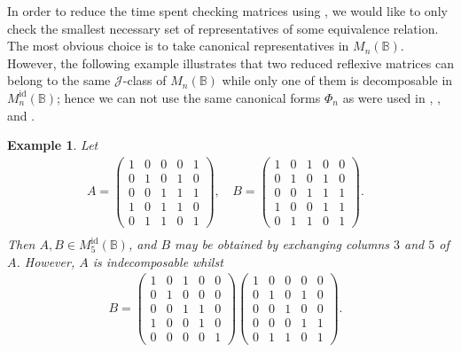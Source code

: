 \documentclass[11pt]{article}
\newtheorem{exa}[thm]{Example}
\newenvironment{ex}{\begin{exa}\rm}{\end{exa}}
\numberwithin{equation}{section}
\newcommand{\B}{\mathbb{B}}
\newcommand{\Bn}{M_n(\B)}
\newcommand{\Refn}{M_n^{\text{id}}(\B)}
\newcommand{\Ref}[1]{M_{#1}^{\text{id}}(\B)}
\newcommand{\J}{\mathscr{J}}
\begin{document}
In order to reduce the time spent checking matrices using
, we would like to only check the smallest
necessary set of representatives of some equivalence relation. The most obvious
choice is to take canonical representatives in $\Bn$. However, the following
example illustrates that two reduced reflexive matrices can belong to the same
$\J$-class of $\Bn$ while only one of them is decomposable in $\Refn$; hence we
can not use the same canonical forms $\Phi_n$ as were used in
, , and . 
\begin{ex}
  Let
\begin{align*}
  A = \begin{pmatrix}
    1 & 0 & 0 & 0 & 1 \\
    0 & 1 & 0 & 1 & 0 \\
    0 & 0 & 1 & 1 & 1 \\
    1 & 0 & 1 & 1 & 0 \\
    0 & 1 & 1 & 0 & 1 
  \end{pmatrix}\text{, }&
  B = \begin{pmatrix}
    1 & 0 & 1 & 0 & 0 \\
    0 & 1 & 0 & 1 & 0 \\
    0 & 0 & 1 & 1 & 1 \\
    1 & 0 & 0 & 1 & 1 \\
    0 & 1 & 1 & 0 & 1 
  \end{pmatrix}.&\\
\end{align*}
Then $A, B \in \Ref{5}$, and $B$ may be obtained by exchanging columns $3$ and
$5$ of $A$. However, $A$ is indecomposable whilst
\begin{align*}
  B = \begin{pmatrix}
    1 & 0 & 1 & 0 & 0 \\
    0 & 1 & 0 & 0 & 0 \\
    0 & 0 & 1 & 1 & 0 \\
    1 & 0 & 0 & 1 & 0 \\
    0 & 0 & 0 & 0 & 1 
  \end{pmatrix}
  \begin{pmatrix}
    1 & 0 & 0 & 0 & 0 \\
    0 & 1 & 0 & 1 & 0 \\
    0 & 0 & 1 & 0 & 0 \\
    0 & 0 & 0 & 1 & 1 \\
    0 & 1 & 1 & 0 & 1 
  \end{pmatrix}.&\\
\end{align*}
\end{ex} 
\end{document}
